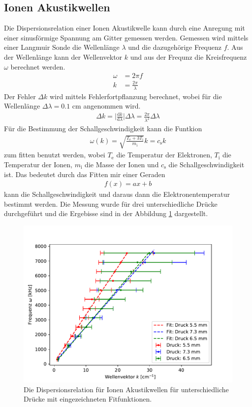 \subsection{Ionen Akustikwellen}
Die Dispersionsrelation einer Ionen Akustikwelle kann durch eine Anregung mit einer sinusförmige Spannung am Gitter gemessen werden. Gemessen wird mittels einer Langmuir Sonde die Wellenlänge $\lambda$ und die dazugehörige Frequenz $f$. Aus der Wellenlänge kann der Wellenvektor $k$ und aus der Frequnz die Kreisfrequenz  $\omega$ berechnet werden.
\begin{align}
  \omega & = 2 \pi f \\
  k & = \frac{2 \pi}{\lambda}
\end{align}
Der Fehler $\Delta k$ wird mittels Fehlerfortpflanzung berechnet, wobei für die Wellenlänge $\Delta \lambda=0.1$ cm angenommen wird.
\begin{align}
  \Delta k = \bigl| \frac{\mathrm{d} k}{\mathrm{d} \lambda} \bigl| \Delta \lambda = \frac{2\pi}{\lambda^2} \Delta \lambda
\end{align}
Für die Bestimmung der Schallgeschwindigkeit kann die  Funtkion 
\begin{align}
  \omega(k) = \sqrt{\frac{T_{\mathrm{e}} + 3 T_{\mathrm{i}}}{m_{\mathrm{i}}}} k = c_{\mathrm{s}} k
  \label{eq:Dispersion_3_3}
\end{align}
zum fitten benutzt werden, wobei $T_{\mathrm{e}}$ die Temperatur der Elektronen, $T_{\mathrm{i}}$ die Temperatur der Ionen, $m_{\mathrm{i}}$ die Masse der Ionen und $c_{\mathrm{s}}$ die Schallgeschwindigkeit ist. Das bedeutet durch das Fitten mir einer Geraden
\begin{align}
  f(x)= a x +b
  \label{eq:fit_Dispersion}
\end{align}
kann die Schallgeschwindigkeit und daraus dann die Elektronentemperatur bestimmt werden. Die Messung wurde für drei unterschiedliche Drücke durchgeführt und die Ergebisse sind in der Abbildung \ref{fig:3_3_Dispersion} dargestellt.
\begin{figure}[H]
\centering
\includegraphics[scale=0.6]{3_3_Dispersion.pdf}
\caption{Die Dispersionsrelation für Ionen Akustikwellen für unterschiedliche Drücke mit eingezeichneten Fitfunktionen.}
\label{fig:3_3_Dispersion}
\end{figure}
